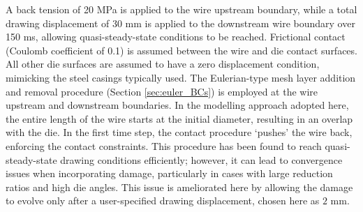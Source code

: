 \documentclass[sn-mathphys,Numbered]{sn-jnl}%
\begin{document}
A back tension of 20 MPa is applied to the wire upstream boundary, while a total drawing displacement of 30 mm is applied to the downstream wire boundary over 150 ms, allowing quasi-steady-state conditions to be reached.
Frictional contact (Coulomb coefficient of 0.1) is assumed between the wire and die contact surfaces.
All other die surfaces are assumed to have a zero displacement condition, mimicking the steel casings typically used.
The Eulerian-type mesh layer addition and removal procedure (Section \ref{sec:euler_BCs}) is employed at the wire upstream and 
downstream boundaries.
In the modelling approach adopted here, the entire length of the wire starts at the initial diameter, resulting in an overlap with the die.
In the first time step, the contact procedure `pushes' the wire back, enforcing the contact constraints.
This procedure has been found to reach quasi-steady-state drawing conditions efficiently; however,
it can lead to convergence issues when incorporating damage, particularly in cases with large reduction ratios and high die angles. %
This issue is ameliorated here by allowing the damage to evolve only after a user-specified drawing displacement, chosen here as $2$ mm.


\end{document}
